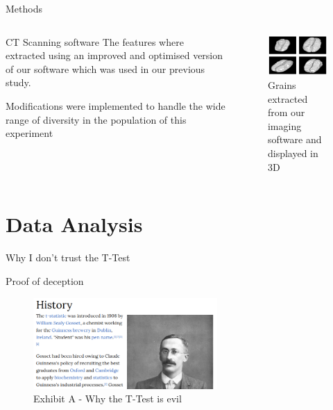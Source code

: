 \documentclass[t, aspectratio=169]{beamer}
\begin{document}
\begin{frame}[label={sec:org0d31c02}]{Methods}
\begin{columns}
\begin{column}{0.5\columnwidth}
\begin{block}{CT Scanning software}
The features where extracted using an improved and optimised version of
our software which was used in our previous study.

\vspace{0.5cm}

Modifications were implemented to handle the wide range of diversity in the population of
this experiment
\end{block}
\end{column}

\begin{column}{0.5\columnwidth}
\vspace{-1cm}
\begin{figure}[htbp]
\centering
\includegraphics[width=7cm]{./images/ctgrains.png}
\caption{Grains extracted from our imaging software and displayed in 3D}
\end{figure}
\end{column}
\end{columns}
\end{frame}

\section{Data Analysis}
\label{sec:orgddc23e9}
\begin{frame}[label={sec:orgb5bf783}]{Why I don't trust the T-Test}
\begin{block}{Proof of deception}
\begin{figure}[htbp]
\centering
\includegraphics[width=7cm]{./images/ttest.png}
\caption{\label{fig:org7d5b355}
Exhibit A - Why the T-Test is evil}
\end{figure}
\end{block}
\end{frame}
\end{document}
